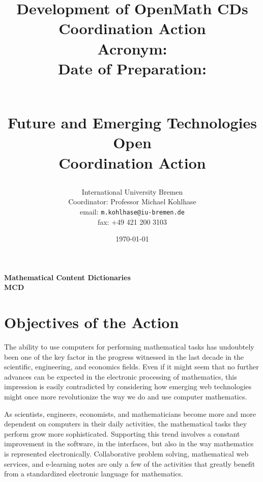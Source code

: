 \documentclass{euproposal}
\begin{document}
\setcounter{part}{2}%


\title{Development of OpenMath CDs Coordination Action\\
  Acronym: \cdca\\
  Date of Preparation: \date{\today} \\
  Future and Emerging Technologies Open\\
  Coordination Action}
\author{International University  Bremen\\
  Coordinator: Professor Michael Kohlhase\\
  email: \texttt{m.kohlhase@iu-bremen.de}\\
  fax: +49 421 200 3103}


\titlepage 
\maketitle

\setcounter{tocdepth}{1}\tableofcontents\newpage
\begin{center}\bf
Mathematical Content Dictionaries\\
MCD
\end{center}
\newpage\setcounter{chapter}{0}

\chapter{Objectives of the Action}


\begin{quote}\sf
\end{quote}


The ability to use computers for performing mathematical tasks has
undoubtely been one of the key factor in the progress witnessed in the
last decade in the scientific, engineering, and economics fields. Even
if it might seem that no further advances can be expected in the
electronic processing of mathematics, this impression is easily
contradicted by considering how emerging web technologies might once
more revolutionize the way we do and use computer mathematics.

As scientists, engineers, economists, and mathematicians become more
and more dependent on computers in their daily activities, the
mathematical tasks they perform grow more sophisticated. Supporting
this trend involves a constant improvement in the software, in the
interfaces, but also in the way mathematics is represented
electronically. Collaborative problem solving, mathematical web
services, and e-learning notes are only a few of the activities that
greatly benefit from a standardized electronic language for
mathematics. 
\end{document}
